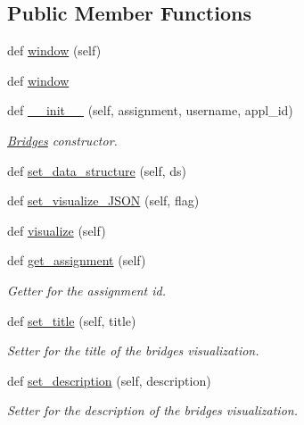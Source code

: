\subsection*{Public Member Functions}
\begin{DoxyCompactItemize}
\item 
def \hyperlink{classbridges_1_1bridges_1_1_bridges_a1340374df9e4aa1490d9cd9be2b0e918}{window} (self)
\item 
def \hyperlink{classbridges_1_1bridges_1_1_bridges_ab434ee3f7b3b8c9eb4f8a07d97789a82}{window}
\item 
def \hyperlink{classbridges_1_1bridges_1_1_bridges_af174072883f6f269a9fe7cc02e12c276}{\+\_\+\+\_\+init\+\_\+\+\_\+} (self, assignment, username, appl\+\_\+id)
\begin{DoxyCompactList}\small\item\em \hyperlink{classbridges_1_1bridges_1_1_bridges}{Bridges} constructor. \end{DoxyCompactList}\item 
def \hyperlink{classbridges_1_1bridges_1_1_bridges_a868f02fa66c87c1a1fc7bd6fbc799291}{set\+\_\+data\+\_\+structure} (self, ds)
\item 
def \hyperlink{classbridges_1_1bridges_1_1_bridges_ab50d018b5178ca33de24157b7b6de285}{set\+\_\+visualize\+\_\+\+J\+S\+ON} (self, flag)
\item 
def \hyperlink{classbridges_1_1bridges_1_1_bridges_a3c1321f8be7b249639a47eba10b67c70}{visualize} (self)
\item 
def \hyperlink{classbridges_1_1bridges_1_1_bridges_a1e7bd56f6a3beb03c91fc989cf3f7eb8}{get\+\_\+assignment} (self)
\begin{DoxyCompactList}\small\item\em Getter for the assignment id. \end{DoxyCompactList}\item 
def \hyperlink{classbridges_1_1bridges_1_1_bridges_a3b0c629c1ae0beaac05fa9d90846c423}{set\+\_\+title} (self, title)
\begin{DoxyCompactList}\small\item\em Setter for the title of the bridges visualization. \end{DoxyCompactList}\item 
def \hyperlink{classbridges_1_1bridges_1_1_bridges_aba86088c031b505bbe88dbc530bf1331}{set\+\_\+description} (self, description)
\begin{DoxyCompactList}\small\item\em Setter for the description of the bridges visualization. \end{DoxyCompactList}\item 

\end{DoxyCompactItemize}
